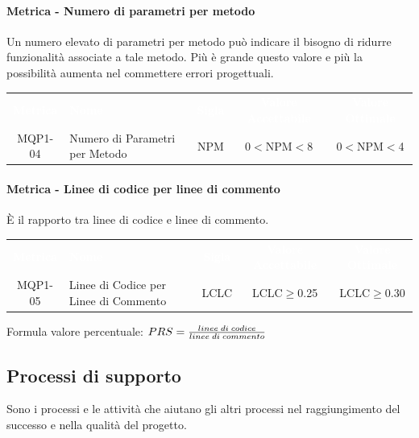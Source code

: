         \paragraph{Metrica - Numero di parametri per metodo}
        Un numero elevato di parametri per metodo può indicare il bisogno di ridurre funzionalità associate a tale metodo. Più è grande questo valore e più la possibilità aumenta nel commettere errori progettuali.
        
        \renewcommand{\arraystretch}{1.5}
        \begin{longtable}{ c C{4cm} c c c}
        \textcolor{white}{\textbf{Metrica}} & \textcolor{white}{\textbf{Nome}} & \textcolor{white}{\textbf{Sigla}} & \textcolor{white}{\textbf{Valore Accettabile}} & \textcolor{white}{\textbf{Valore Ottimale}}\\
        MQP1-04 & Numero di Parametri per Metodo & NPM & 0$<$NPM$<$8 & 0$<$NPM$<$4 \\	     
        \end{longtable}

        \paragraph{Metrica - Linee di codice per linee di commento}
        È il rapporto tra linee di codice e linee di commento.

        \renewcommand{\arraystretch}{1.5}
        \begin{longtable}{ c C{4cm} c c c}
        \textcolor{white}{\textbf{Metrica}} & \textcolor{white}{\textbf{Nome}} & \textcolor{white}{\textbf{Sigla}} & \textcolor{white}{\textbf{Valore Accettabile}} & \textcolor{white}{\textbf{Valore Ottimale}}\\
        MQP1-05 & Linee di Codice per Linee di Commento & LCLC & LCLC$\geq$0.25 & LCLC$\geq$0.30 \\	     
        \end{longtable}
        Formula valore percentuale: \begin{math}{PRS = {linee \; di \; codice \over linee \; di \; commento}}\end{math}

\subsection{Processi di supporto}
Sono i processi e le attività che aiutano gli altri processi nel raggiungimento del successo e nella qualità del progetto.
